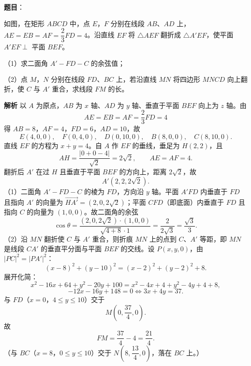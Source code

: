\begin{answer}

\textbf{题目}：

如图，在矩形 $ABCD$ 中，点 $E$，$F$ 分别在线段 $AB$、$AD$ 上，$AE=EB=AF=\dfrac23FD=4$。沿直线 $EF$ 将 $\triangle AEF$ 翻折成 $\triangle A'EF$，使平面 $A'EF\perp$ 平面 $BEF$。

（1）求二面角 $A'-FD-C$ 的余弦值；

（2）点 $M$，$N$ 分别在线段 $FD$、$BC$ 上，若沿直线 $MN$ 将四边形 $MNCD$ 向上翻折，使 $C$ 与 $A'$ 重合，求线段 $FM$ 的长。
\nopagebreak[4]
\begin{center}\end{center}
\nopagebreak[4]
\textbf{解析}
以 $A$ 为原点，$AB$ 为 $x$ 轴、$AD$ 为 $y$ 轴、垂直于平面 $BEF$ 向上为 $z$ 轴。由
\nopagebreak[4]
\[AE=EB=AF=\frac23FD=4\]
得 $AB=8$，$AF=4$，$FD=6$，$AD=10$，故
\nopagebreak[4]
\[E(4,0,0),\quad F(0,4,0),\quad D(0,10,0),\quad B(8,0,0),\quad C(8,10,0).\]
直线 $EF$ 的方程为 $x+y=4$。自 $A$ 作 $EF$ 的垂线，垂足为 $H(2,2)$，且
\nopagebreak[4]
\[AH=\frac{|0+0-4|}{\sqrt2}=2\sqrt2,\qquad AE=AF=4.\]
翻折后 $A'$ 在过 $H$ 且垂直于平面 $BEF$ 的方向上，距离 $2\sqrt2$，故
\nopagebreak[4]
\[A'(2,2,2\sqrt2).\]
（1）二面角 $A'-FD-C$ 的棱为 $FD$，方向沿 $y$ 轴。平面 $A'FD$ 内垂直于 $FD$ 且指向 $A'$ 的向量为 $\overrightarrow{HA'}=(2,0,2\sqrt2)$；平面 $CFD$（即底面）内垂直于 $FD$ 且指向 $C$ 的向量为 $(1,0,0)$。故二面角的余弦
\nopagebreak[4]
\[\cos\theta=\frac{(2,0,2\sqrt2)\cdot(1,0,0)}
{\sqrt{4+8}\cdot1}=\frac2{2\sqrt3}=\frac{\sqrt3}3.\]
（2）沿 $MN$ 翻折使 $C$ 与 $A'$ 重合，则折痕 $MN$ 上的点到 $C$、$A'$ 等距，即 $MN$ 是线段 $CA'$ 的垂直平分面与平面 $BEF$ 的交线。设 $P(x,y,0)$，由 $|PC|^2=|PA'|^2$：
\nopagebreak[4]
\[(x-8)^2+(y-10)^2=(x-2)^2+(y-2)^2+8.\]
展开化简：
\nopagebreak[4]
\[x^2-16x+64+y^2-20y+100=x^2-4x+4+y^2-4y+4+8,\]
\nopagebreak[4]
\[-12x-16y+148=0\iff3x+4y=37.\]
与 $FD$（$x=0$，$4\leqslant y\leqslant10$）交于
\nopagebreak[4]
\[M\left(0,\frac{37}4,0\right).\]
故
\nopagebreak[4]
\[FM=\frac{37}4-4=\frac{21}4.\]
（与 $BC$（$x=8$，$0\leqslant y\leqslant10$）交于 $N\left(8,\dfrac{13}4,0\right)$，落在 $BC$ 上。）


\end{answer}
